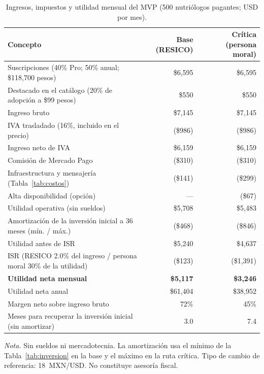 \documentclass[12pt, a4paper]{article}
\begin{document}
\begin{table}[!htbp]
  \centering
  \caption{Ingresos, impuestos y utilidad mensual del MVP (500 nutriólogos
  pagantes; USD por mes).}
  \label{tab:ingresos}
  \footnotesize
  \begin{tabularx}{\textwidth}{X r r}
    \toprule
    \textbf{Concepto} & \textbf{Base (RESICO)} & \textbf{Crítica (persona moral)} \\
    \midrule
    Suscripciones (40\% Pro; 50\% anual; \$118,700 pesos) & \$6,595 & \$6,595 \\
    Destacado en el catálogo (20\% de adopción a \$99 pesos) & \$550 & \$550 \\
    Ingreso bruto & \$7,145 & \$7,145 \\
    IVA trasladado (16\%, incluido en el precio) & (\$986) & (\$986) \\
    Ingreso neto de IVA & \$6,159 & \$6,159 \\
    Comisión de Mercado Pago & (\$310) & (\$310) \\
    Infraestructura y mensajería (Tabla~\ref{tab:costos}) & (\$141) & (\$299) \\
    Alta disponibilidad (opción) & --- & (\$67) \\
    Utilidad operativa (sin sueldos) & \$5,708 & \$5,483 \\
    Amortización de la inversión inicial a 36 meses (mín. / máx.) & (\$468) & (\$846) \\
    Utilidad antes de ISR & \$5,240 & \$4,637 \\
    ISR (RESICO 2.0\% del ingreso / persona moral 30\% de la utilidad) & (\$123) & (\$1,391) \\
    \textbf{Utilidad neta mensual} & \textbf{\$5,117} & \textbf{\$3,246} \\
    Utilidad neta anual & \$61,404 & \$38,952 \\
    Margen neto sobre ingreso bruto & 72\% & 45\% \\
    Meses para recuperar la inversión inicial (sin amortizar) & 3.0 & 7.4 \\
    \bottomrule
  \end{tabularx}
  \begin{flushleft}
    \small\textit{Nota.} Sin sueldos ni mercadotecnia. La amortización usa el
    mínimo de la Tabla~\ref{tab:inversion} en la base y el máximo en la
    ruta crítica. Tipo de cambio de referencia: 18~MXN/USD. No constituye asesoría fiscal.
  \end{flushleft}
\end{table}
\end{document}
